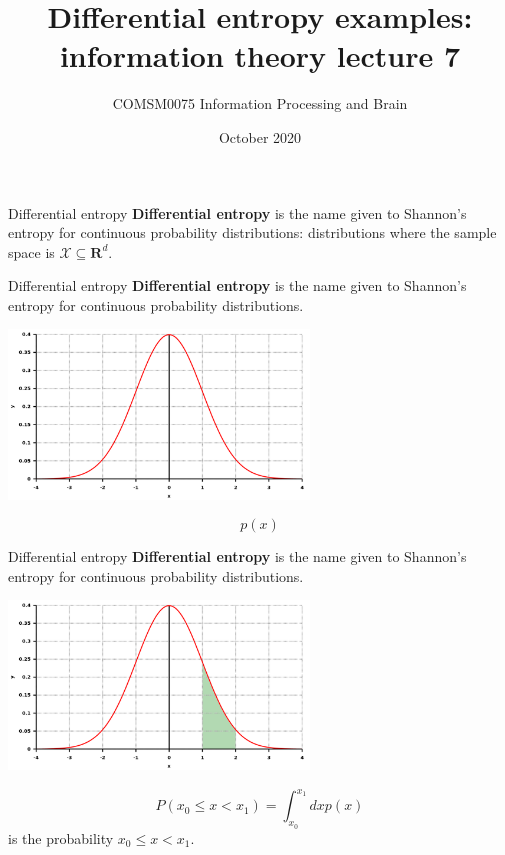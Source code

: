 \documentclass{beamer}
\title[Information Theory lecture 7]{Differential entropy examples: information theory lecture 7}
\author{COMSM0075 Information Processing and Brain}
\institute{\texttt{comsm0075.github.io}}
\date{October 2020}
\newcommand{\cgish}{\color{greenish}}
\newcommand{\cbla}{\color{black}}
\newcommand{\cred}{\color{red}}
\begin{document}
\maketitle


\begin{frame}{Differential entropy}
\textbf{Differential entropy} is the name given to Shannon's entropy
for continuous probability distributions: distributions where the sample space is $\mathcal{X}\subseteq \textbf{R}^d$.


  \end{frame}


\begin{frame}{Differential entropy}
\textbf{Differential entropy} is the name given to Shannon's entropy
for continuous probability distributions.
\begin{center}
  \includegraphics[width=8cm]{Gauss.svg.png}
\end{center}
\cred
$$
p(x)
$$
\cbla
\vfill
{}
  \end{frame}


\begin{frame}{Differential entropy}
\textbf{Differential entropy} is the name given to Shannon's entropy
for continuous probability distributions.
\begin{center}
  \includegraphics[width=8cm]{Gauss_area.png}
\end{center}
\cgish
  $$P(x_0\le x< x_1)=\int_{x_0}^{x_1}dx p(x)$$\cbla{} is the probability\cgish{} $x_0\le x< x_1$.
\cbla
\vfill
{}
  \end{frame}
\end{document}
